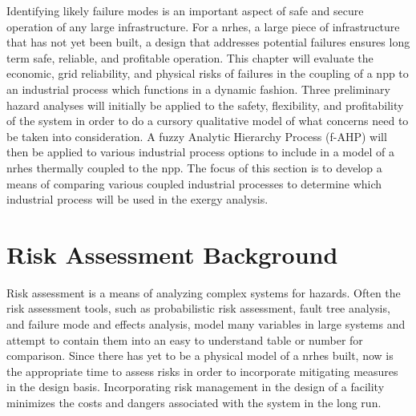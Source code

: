 Identifying likely failure modes is an important aspect of safe and secure operation of any large infrastructure. For a \ac{nrhes}, a large piece of infrastructure that has not yet been built, a design that addresses potential failures ensures long term safe, reliable, and profitable operation. This chapter will evaluate the economic, grid reliability, and physical risks of failures in the coupling of a \ac{npp} to an industrial process which functions in a dynamic fashion. Three preliminary hazard analyses will initially be applied to the safety, flexibility, and profitability of the system in order to do a cursory qualitative model of what concerns need to be taken into consideration. A fuzzy Analytic Hierarchy Process (f-AHP) will then be applied to various industrial process options to include in a model of a \ac{nrhes} thermally coupled to the \ac{npp}. The focus of this section is to develop a means of comparing various coupled industrial processes to determine which industrial process will be used in the exergy analysis.
\section{Risk Assessment Background}
Risk assessment is a means of analyzing complex systems for hazards. Often the risk assessment tools, such as probabilistic risk assessment, fault tree analysis, and failure mode and effects analysis, model many variables in large systems and attempt to contain them into an easy to understand table or number for comparison. Since there has yet to be a physical model of a \ac{nrhes} built, now is the appropriate time to assess risks in order to incorporate mitigating measures in the design basis. Incorporating risk management in the design of a facility minimizes the costs and dangers associated with the system in the long run.


